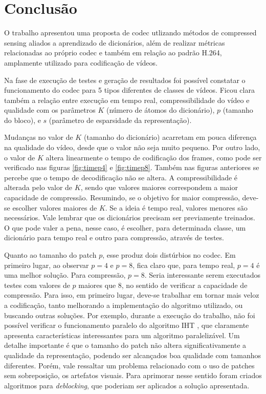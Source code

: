 \documentclass[cic,tc]{iiufrgs}
\begin{document}
\chapter{Conclusão}
O trabalho apresentou uma proposta de codec utlizando métodos de compressed sensing
aliados a aprendizado de dicionários, além de realizar métricas relacionadas ao próprio codec 
e também em relação ao padrão H.264, amplamente utilizado para codificação de vídeos.

Na fase de execução de testes e geração de resultados foi possível constatar o funcionamento 
do codec para 5 tipos diferentes de classes de vídeos.
Ficou clara também a relação entre execução em tempo real, compressibilidade do vídeo e 
qualidade com os parâmetros $K$ (número de átomos do dicionário), $p$ (tamanho do bloco), 
e $s$ (parâmetro de esparsidade da representação).

Mudanças no valor de $K$ (tamanho do dicionário) acarretam em pouca diferença na qualidade do vídeo, desde que 
o valor não seja muito pequeno. 
Por outro lado, o valor de $K$ altera linearmente o tempo de codificação dos frames, como 
pode ser verificado nas figuras \ref{fig:timep4} e \ref{fig:timep8}.
Também nas figuras anteriores se percebe que o tempo de decodificação não se altera.
A compressibilidade é alterada pelo valor de $K$, sendo que valores maiores correspondem 
a maior capacidade de compressão.
Resumindo, se o objetivo for maior compressão, deve-se escolher valores maiores de $K$.
Se a ideia é tempo real, valores menores são necessários.
Vale lembrar que os dicionários precisam ser previamente treinados. 
O que pode valer a pena, nesse caso, é escolher, para determinada classe, um dicionário para 
tempo real e outro para compressão, através de testes.

Quanto ao tamanho do patch $p$, esse produz dois distúrbios no codec.
Em primeiro lugar, ao observar $p=4$ e $p=8$, fica claro que, para tempo real, $p=4$ é uma melhor 
solução. Para compressão, $p=8$. 
Seria interessante serem executados testes com valores de $p$ maiores que $8$, 
no sentido de verificar a capacidade de compressão.
Para isso, em primeiro lugar, deve-se trabalhar em tornar mais veloz a codificação, tanto 
melhorando a implementação do algoritmo utilizado, ou buscando outras soluções.
Por exemplo, durante a execução do trabalho, não foi possível verificar o funcionamento 
paralelo do algoritmo IHT \cite{BLUMENSATHIHT}, que claramente apresenta características
interessantes para um algoritmo paralelizável.
Um detalhe importante é que o tamanho do patch não altera significativamente a qualidade 
da representação, podendo ser alcançados boa qualidade com tamanhos diferentes. 
Porém, vale ressaltar um problema relacionado com o uso de patches sem sobreposição, os 
artefatos visuais. 
Para aprimorar nesse sentido foram criados algoritmos para \emph{deblocking}, que poderiam 
ser aplicados a solução apresentada.
\end{document}

